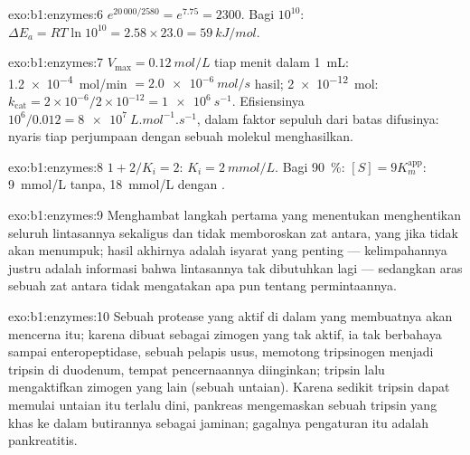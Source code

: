 \begin{solution}{exo:b1:enzymes:6}
$e^{20\,000/2580} = e^{7.75} = 2300$. Bagi $10^{10}$: $\Delta E_a =
RT\ln 10^{10} = 2.58\times 23.0 = \qty{59}{kJ/mol}$.
\end{solution}

\begin{solution}{exo:b1:enzymes:7}
$V_{\max} = \qty{0.12}{mol/L}$ tiap menit dalam \qty{1}{mL}:
\qty{1.2e-4}{mol/min} $= \qty{2.0e-6}{mol/s}$ hasil; 
\qty{2e-12}{mol}: $k_{\text{cat}} = 2\times 10^{-6}/2\times 10^{-12} =
\qty{1e6}{s^{-1}}$. Efisiensinya $10^6/0.012 = \qty{8e7}{L.mol^{-1}.s^{-1}}$,
dalam faktor sepuluh dari batas difusinya: nyaris tiap perjumpaan
dengan sebuah molekul  menghasilkan.
\end{solution}

\begin{solution}{exo:b1:enzymes:8}
$1 + 2/K_i = 2$: $K_i = \qty{2}{mmol/L}$. Bagi \qty{90}{\%}:
$[S] = 9K_m^{\text{app}}$: \qty{9}{mmol/L} tanpa, \qty{18}{mmol/L}
dengan .
\end{solution}

\begin{solution}{exo:b1:enzymes:9}
Menghambat langkah pertama yang menentukan menghentikan seluruh
lintasannya sekaligus dan tidak memboroskan zat antara, yang jika tidak
akan menumpuk; hasil akhirnya adalah isyarat yang penting ---
kelimpahannya justru adalah informasi bahwa lintasannya tak dibutuhkan
lagi --- sedangkan aras sebuah zat antara tidak mengatakan apa pun
tentang permintaannya.
\end{solution}

\begin{solution}{exo:b1:enzymes:10}
Sebuah protease yang aktif di dalam  yang membuatnya akan mencerna
 itu; karena dibuat sebagai zimogen yang tak aktif, ia tak
berbahaya sampai enteropeptidase, sebuah  pelapis usus, memotong
tripsinogen menjadi tripsin di duodenum, tempat pencernaannya
diinginkan; tripsin lalu mengaktifkan zimogen yang lain (sebuah
untaian). Karena sedikit tripsin dapat memulai untaian itu terlalu
dini, pankreas mengemaskan sebuah  tripsin yang khas ke dalam
butirannya sebagai jaminan; gagalnya pengaturan itu adalah pankreatitis.
\end{solution}

